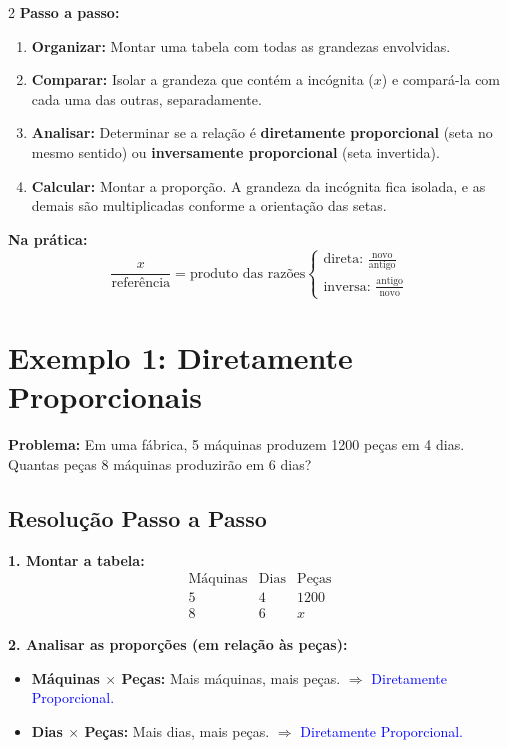 \documentclass[11pt]{article}
\begin{document}
\begin{multicols}{2}
\textbf{Passo a passo:}
\begin{enumerate}
    \item \textbf{Organizar:} Montar uma tabela com todas as grandezas envolvidas.
    \item \textbf{Comparar:} Isolar a grandeza que contém a incógnita ($x$) e compará-la com cada uma das outras, separadamente.
    \item \textbf{Analisar:} Determinar se a relação é \textbf{diretamente proporcional} (seta no mesmo sentido) ou \textbf{inversamente proporcional} (seta invertida).
    \item \textbf{Calcular:} Montar a proporção. A grandeza da incógnita fica isolada, e as demais são multiplicadas conforme a orientação das setas.
\end{enumerate}

\textbf{Na prática:}
\[
\frac{x}{\text{referência}} = \text{produto das razões} 
\begin{cases}
\text{direta: } \frac{\text{novo}}{\text{antigo}} \\
\text{inversa: } \frac{\text{antigo}}{\text{novo}}
\end{cases}
\]

\section*{Exemplo 1: Diretamente Proporcionais}

\textbf{Problema:} Em uma fábrica, 5 máquinas produzem 1200 peças em 4 dias. Quantas peças 8 máquinas produzirão em 6 dias?

\subsection*{Resolução Passo a Passo}

\textbf{1. Montar a tabela:}
\[
\begin{array}{c|c|c}
\text{Máquinas} & \text{Dias} & \text{Peças} \\
\hline
5 & 4 & 1200 \\
8 & 6 & x
\end{array}
\]

\textbf{2. Analisar as proporções (em relação às peças):}
\begin{itemize}
    \item \textbf{Máquinas $\times$ Peças:} Mais máquinas, mais peças. $\Rightarrow$ \textcolor{blue}{Diretamente Proporcional.}
    \item \textbf{Dias $\times$ Peças:} Mais dias, mais peças. $\Rightarrow$ \textcolor{blue}{Diretamente Proporcional.}
\end{itemize}


\end{multicols}
\end{document}
